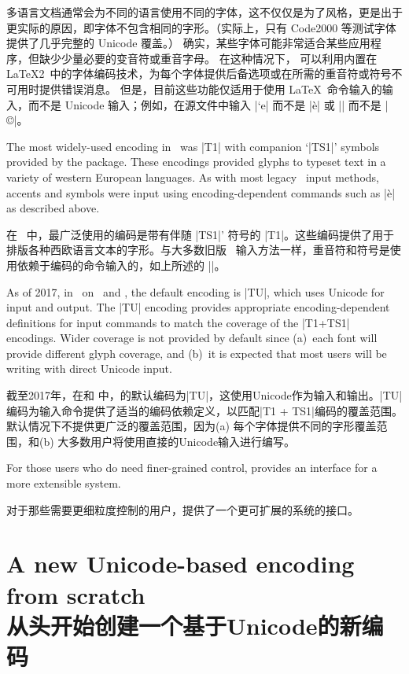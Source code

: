 \documentclass[a4paper]{l3doc}
\begin{document}
多语言文档通常会为不同的语言使用不同的字体，这不仅仅是为了风格，更是出于更实际的原因，即字体不包含相同的字形。（实际上，只有 Code2000 等测试字体提供了几乎完整的 Unicode 覆盖。）
确实，某些字体可能非常适合某些应用程序，但缺少少量必要的变音符或重音字母。
在这种情况下， 可以利用内置在 \LaTeX2\ 中的字体编码技术，为每个字体提供后备选项或在所需的重音符或符号不可用时提供错误消息。
但是，目前这些功能仅适用于使用 \LaTeX\ 命令输入的输入，而不是 Unicode 输入；例如，在源文件中输入 |`e| 而不是 |è| 或 |\textcopyright| 而不是 |©|。

The most widely-used encoding in \LaTeXe\ was |T1| with companion `|TS1|' symbols
provided by the  package.
These encodings provided glyphs to typeset text in a variety of western European languages.
As with most legacy \LaTeXe\ input methods, accents and symbols were input using
encoding-dependent commands such as |\`e| as described above.

在 \LaTeXe\ 中，最广泛使用的编码是带有伴随 |TS1|' 符号的 |T1|。这些编码提供了用于排版各种西欧语言文本的字形。与大多数旧版 \LaTeXe\ 输入方法一样，重音符和符号是使用依赖于编码的命令输入的，如上所述的 |\e|。

As of 2017, in \LaTeXe\ on \XeTeX\ and \LuaTeX, the default encoding is |TU|,
which uses Unicode for input and output.
The |TU| encoding provides appropriate encoding-dependent definitions for input commands
to match the coverage of the |T1+TS1| encodings.
Wider coverage is not provided by default since (a)~each font will provide different glyph coverage, and
(b)~it is expected that most users will be writing with direct Unicode input.

截至2017年，在\XeTeX 和 \LuaTeX 中，\LaTeXe 的默认编码为|TU|，这使用Unicode作为输入和输出。|TU|编码为输入命令提供了适当的编码依赖定义，以匹配|T1 + TS1|编码的覆盖范围。默认情况下不提供更广泛的覆盖范围，因为(a) 每个字体提供不同的字形覆盖范围，和(b) 大多数用户将使用直接的Unicode输入进行编写。


For those users who do need finer-grained control,  provides an
interface for a more extensible system.

对于那些需要更细粒度控制的用户，提供了一个更可扩展的系统的接口。


\section{A new Unicode-based encoding from scratch\\从头开始创建一个基于Unicode的新编码}
\end{document}
